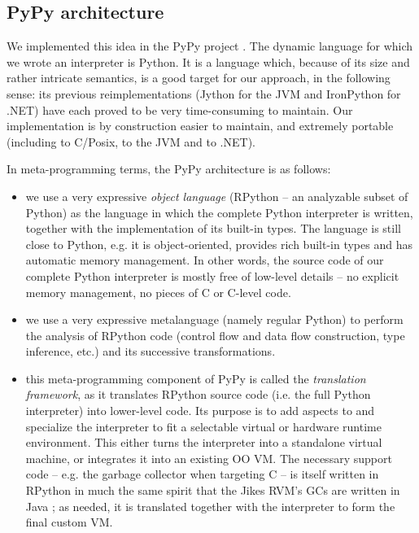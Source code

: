 \documentclass{llncs}
\begin{document}
\subsection{PyPy architecture}

We implemented this idea in the PyPy project \cite{pypy}.  The dynamic language
for which we wrote an interpreter is Python.  It is a language which,
because of its size and rather intricate semantics, is a good target for
our approach, in the following sense: its previous reimplementations
(Jython for the JVM and IronPython for .NET) have each proved to be very
time-consuming to maintain.  Our implementation is by construction
easier to maintain, and extremely portable (including to C/Posix, to the
JVM and to .NET).

In meta-programming terms, the PyPy architecture is as follows:

\begin{itemize}

\item
we use a very expressive \emph{object language} (RPython -- an analyzable
subset of Python) as the language in which the complete Python
interpreter is written, together with the implementation of its
built-in types.  The language is still close to Python, e.g.  it is
object-oriented, provides rich built-in types and has automatic memory
management.  In other words, the source code of our complete Python
interpreter is mostly free of low-level details -- no explicit memory
management, no pieces of C or C-level code.

\item
we use a very expressive metalanguage (namely regular Python) to
perform the analysis of RPython code (control flow and data flow
construction, type inference, etc.) and its successive
transformations.

\item
this meta-programming component of PyPy is called the \emph{translation
framework}, as it translates RPython source code (i.e. the full Python
interpreter) into lower-level code.  Its purpose is to add aspects to
and specialize the interpreter to fit a selectable virtual or hardware
runtime environment.  This either turns the interpreter into a
standalone virtual machine, or integrates it into an existing OO VM.
The necessary support code -- e.g. the garbage collector when
targeting C -- is itself written in RPython in much the same spirit
that the Jikes RVM's GCs are written in Java \cite{JikesGC}; as needed, it is
translated together with the interpreter to form the final custom VM.
\end{itemize}
\end{document}
